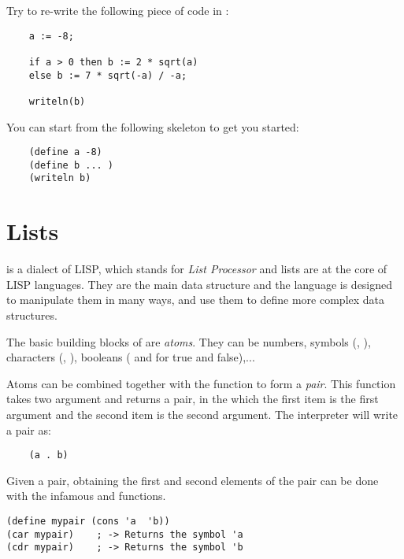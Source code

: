 \documentclass{../../../tp}
\begin{document}
\begin{instruction}
	
	Try to re-write the following \pascal piece of code in \scheme :
	
	\begin{verbatim}
	a := -8;
	
	if a > 0 then b := 2 * sqrt(a)
	else b := 7 * sqrt(-a) / -a;
	
	writeln(b)
	\end{verbatim}
	
	You can start from the following skeleton to get you started:
	
	\begin{verbatim}
	(define a -8)
	(define b ... )
	(writeln b)     
	\end{verbatim}
	
\end{instruction}




\section{Lists}

\scheme is a dialect of LISP, which stands for \emph{List Processor} and lists are at the core of LISP languages. They are the main data structure and the language is designed to manipulate them in many ways, and use them to define more complex data structures.

The basic building blocks of \scheme are \emph{atoms}. They can be numbers, symbols (, ), characters (\schemecode{#\a}, \schemecode{#\Z}), booleans ( and  for true and false),... 

Atoms can be combined together with the  function to form a \emph{pair}. This function takes two argument and returns a pair, in the which the first item is the first argument and the second item is the second argument. The \scheme interpreter will write a pair as:

\begin{verbatim}
	(a . b)
\end{verbatim}

Given a pair, obtaining the first and second elements of the pair can be done with the infamous \car and \cdr functions.

\begin{verbatim}
(define mypair (cons 'a  'b))
(car mypair)	; -> Returns the symbol 'a
(cdr mypair)	; -> Returns the symbol 'b
\end{verbatim}
\end{document}

